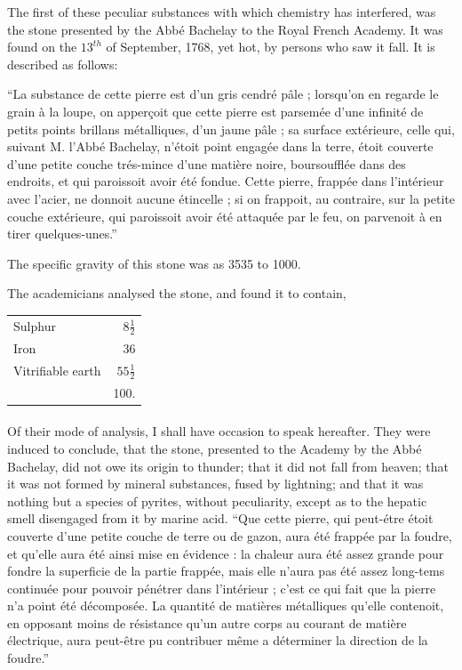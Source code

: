\documentclass[a4paper, 12pt, oneside, twocolumn]{article}
\begin{document}
The first of these peculiar substances with which chemistry has interfered, was the stone presented by the Abbé Bachelay to the Royal French Academy. It was found on the $13^{th}$ of September, 1768, yet hot, by persons who saw it fall. It is described as follows:

``La substance de cette pierre est d'un gris cendré pâle ; lorsqu'on en regarde le grain à la loupe, on apperçoit que cette pierre est parsemée d'une infinité de petits points brillans métalliques, d'un jaune pâle ; sa surface extérieure, celle qui, suivant M. l'Abbé Bachelay, n'étoit point engagée dans la terre, étoit couverte d'une petite couche trés-mince d'une matière noire, boursoufflée dans des endroits, et qui paroissoit avoir été fondue. Cette pierre, frappée dans l'intérieur avec l'acier, ne donnoit aucune étincelle ; si on frappoit, au contraire, sur la petite couche extérieure, qui paroissoit avoir été attaquée par le feu, on parvenoit à en tirer quelques-unes.''

The specific gravity of this stone was as 3535 to 1000.

The academicians analysed the stone, and found it to contain,
\begin{table}[H]
    \centering\bfseries
    \begin{tabular}{l r}
        Sulphur & $8\frac{1}{2}$ \\ 
        Iron & 36 \\
        Vitrifiable earth & $55\frac{1}{2}$ \\ \hline
        ~ & 100. \\
    \end{tabular}
\end{table}
\paragraph{}
Of their mode of analysis, I shall have occasion to speak hereafter. They were induced to conclude, that the stone, presented to the Academy by the Abbé Bachelay, did not owe its origin to thunder; that it did not fall from heaven; that it was not formed by mineral substances, fused by lightning; and that it was nothing but a species of pyrites, without peculiarity, except as to the hepatic smell disengaged from it by marine acid. ``Que cette pierre, qui peut-étre étoit couverte d'une petite couche de terre ou de gazon, aura été frappée par la foudre, et qu'elle aura été ainsi mise en évidence : la chaleur aura été assez grande pour fondre la superficie de la partie frappée, mais elle n'aura pas été assez long-tems continuée pour pouvoir pénétrer dans l'intérieur ; c'est ce qui fait que la pierre n'a point été décomposée. La quantité de matières métalliques qu'elle contenoit, en opposant moins de résistance qu'un autre corps au courant de matière électrique, aura peut-être pu contribuer même a déterminer la direction de la foudre.''
\end{document}
